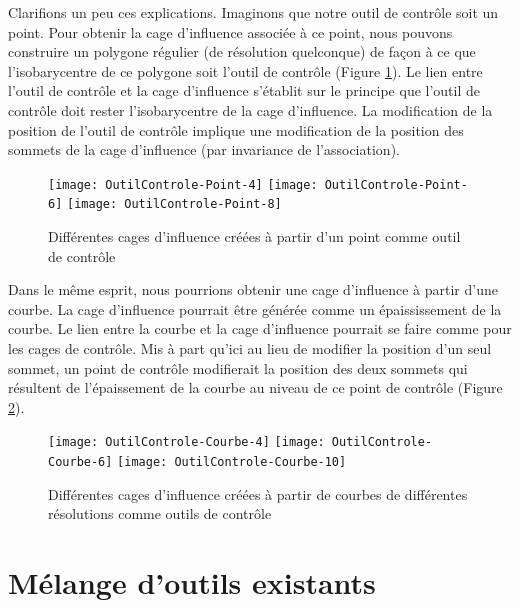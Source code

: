 Clarifions un peu ces explications. Imaginons que notre outil de contrôle soit
un point. Pour obtenir la cage d'influence associée à ce point, nous pouvons
construire un polygone régulier (de résolution quelconque) de façon à ce que
l'isobarycentre de ce polygone soit l'outil de contrôle (Figure \ref{EXTPoi}).
Le lien entre l'outil de contrôle et la cage d'influence s'établit sur le
principe que l'outil de contrôle doit rester l'isobarycentre de la cage
d'influence. La modification de la position de l'outil de contrôle implique
une modification de la position des sommets de la cage d'influence (par
invariance de l'association).

\begin{figure}[ht]
\begin{center}
  \texttt{[image: OutilControle-Point-4]}
  \texttt{[image: OutilControle-Point-6]}
  \texttt{[image: OutilControle-Point-8]}

  \caption[Cages d'influence à partir d'un point] {Différentes cages
d'influence créées à partir d'un point comme outil de contrôle}
  \label{EXTPoi}

\end{center}
\end{figure}

Dans le même esprit, nous pourrions obtenir une cage d'influence à partir
d'une courbe. La cage d'influence pourrait être générée comme un
épaississement de la courbe. Le lien entre la courbe et la cage d'influence
pourrait se faire comme pour les cages de contrôle. Mis à part qu'ici au lieu
de modifier la position d'un seul sommet, un point de contrôle modifierait la
position des deux sommets qui résultent de l'épaissement de la courbe au niveau
de ce point de contrôle (Figure \ref{EXTCou}).

\begin{figure}[ht]
\begin{center}
  \texttt{[image: OutilControle-Courbe-4]}
  \texttt{[image: OutilControle-Courbe-6]}
  \texttt{[image: OutilControle-Courbe-10]}

  \caption[Cages d'influence à partir d'une courbe] {Différentes cages
d'influence créées à partir de courbes de différentes résolutions comme outils
de contrôle}

  \label{EXTCou}

\end{center}
\end{figure}

\section{Mélange d'outils existants}

